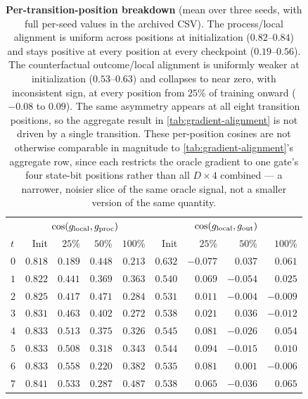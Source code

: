 \begin{table}[htbp]
\centering
\small
\begin{tabular}{lrrrrrrrr}
\toprule
& \multicolumn{4}{c}{$\cos(g_{\rm local},g_{\rm proc})$} & \multicolumn{4}{c}{$\cos(g_{\rm local},g_{\rm out})$}\\
$t$ & Init & $25\%$ & $50\%$ & $100\%$ & Init & $25\%$ & $50\%$ & $100\%$\\
\midrule
$0$ & $0.818$ & $0.189$ & $0.448$ & $0.213$ & $0.632$ & $-0.077$ & $0.037$ & $0.061$\\
$1$ & $0.822$ & $0.441$ & $0.369$ & $0.363$ & $0.540$ & $0.069$ & $-0.054$ & $0.025$\\
$2$ & $0.825$ & $0.417$ & $0.471$ & $0.284$ & $0.531$ & $0.011$ & $-0.004$ & $-0.009$\\
$3$ & $0.831$ & $0.463$ & $0.402$ & $0.272$ & $0.538$ & $0.021$ & $0.036$ & $-0.012$\\
$4$ & $0.833$ & $0.513$ & $0.375$ & $0.326$ & $0.545$ & $0.081$ & $-0.026$ & $0.054$\\
$5$ & $0.833$ & $0.508$ & $0.318$ & $0.343$ & $0.544$ & $0.094$ & $-0.015$ & $0.010$\\
$6$ & $0.833$ & $0.558$ & $0.220$ & $0.382$ & $0.535$ & $0.081$ & $0.001$ & $-0.006$\\
$7$ & $0.841$ & $0.533$ & $0.287$ & $0.487$ & $0.538$ & $0.065$ & $-0.036$ & $0.065$\\
\bottomrule
\end{tabular}
\caption{\textbf{Per-transition-position breakdown} (mean over three
seeds, with full per-seed values in the archived CSV). The process/local
alignment is uniform across positions at initialization ($0.82$--$0.84$)
and stays positive at every position at every checkpoint ($0.19$--$0.56$).
The counterfactual outcome/local alignment is uniformly weaker at
initialization ($0.53$--$0.63$) and collapses to near zero, with
inconsistent sign, at every position from $25\%$ of training onward
($-0.08$ to $0.09$). The same asymmetry appears at all eight transition
positions, so the aggregate result in \cref{tab:gradient-alignment} is not
driven by a single transition. These per-position cosines are not
otherwise comparable in magnitude to \cref{tab:gradient-alignment}'s
aggregate row, since each restricts the oracle gradient to one gate's four
state-bit positions rather than all $D\times4$ combined --- a narrower,
noisier slice of the same oracle signal, not a smaller version of the
same quantity.}
\label{tab:gradient-alignment-positions}
\end{table}

